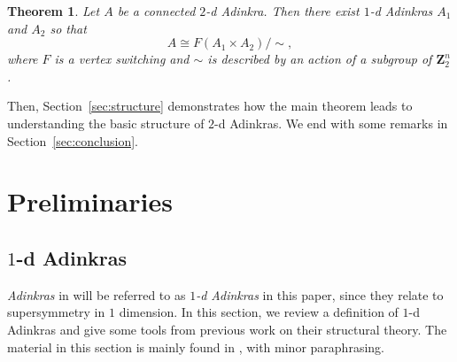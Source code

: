 \documentclass[12pt,twoside,singlespace]{article}
\numberwithin{equation}{section}
\newtheorem{thm}[equation]{Theorem}
\theoremstyle{definition}
\newcommand{\ZZ}{\mathbf{Z}}
\begin{document}
\begin{thm}
\label{thm:main}
Let $A$ be a connected $2$-d Adinkra.  Then there exist $1$-d Adinkras $A_1$ and $A_2$ so that
\[A\cong F(A_1\times A_2)/\sim, \]
where $F$ is a vertex switching and  $\sim$ is described by an action of a subgroup of $\ZZ_2^n$.
\end{thm}
Then, Section~\ref{sec:structure} demonstrates how the main theorem leads to understanding the basic structure of $2$-d Adinkras. We end with some remarks in Section~\ref{sec:conclusion}.

\section{Preliminaries}
\label{sec:prelim}

\subsection{$1$-d Adinkras}
\label{sec:1d}
\emph{Adinkras} in \cite{d2l:first,d2l:graph-theoretic,zhang:adinkras} will be referred to as \emph{$1$-d Adinkras} in this paper, since they relate to supersymmetry in $1$ dimension. In this section, we  review a definition of $1$-d Adinkras and give some tools from previous work on their structural theory. The material in this section is mainly found in \cite{d2l:omni,zhang:adinkras}, with minor paraphrasing. 
\end{document}

